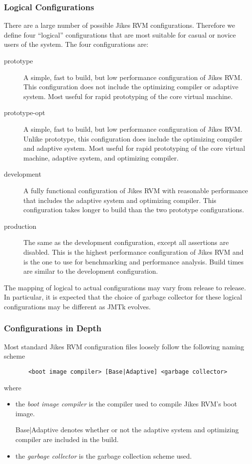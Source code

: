 \subsubsection{Logical Configurations}
There are a large number of possible Jikes RVM configurations.
Therefore we define four ``logical'' configurations that are most
suitable for casual or novice users of the system.  The four
configurations are: 
\begin{description}
\item [prototype] A simple, fast to build, but low performance
configuration of Jikes RVM.  This configuration does not include the
optimizing compiler or adaptive system.  Most useful for rapid
prototyping of the core virtual machine.
\item [prototype-opt] A simple, fast to build, but low performance
configuration of Jikes RVM.  Unlike prototype, this configuration does
include the optimizing compiler and adaptive system. Most useful for
rapid prototyping of the core virtual machine, adaptive system, and
optimizing compiler. 
\item [development] A fully functional configuration of
Jikes RVM with reasonable performance that includes the adaptive
system and optimizing compiler. This configuration takes longer to
build than the two prototype configurations.
\item [production] The same as the development configuration,
except all assertions are disabled.  This is the highest performance
configuration of Jikes RVM and is the one to use for benchmarking and
performance analysis. Build times are similar to the development
configuration. 
\end{description}
The mapping of logical to actual configurations may vary from release
to release.  In particular, it is expected that the choice of garbage
collector for these logical configurations may be different as JMTk
evolves. 

\subsubsection{Configurations in Depth}

Most standard Jikes RVM configuration files loosely follow the
following naming scheme 
\begin{verbatim}
       <boot image compiler> [Base|Adaptive] <garbage collector>
\end{verbatim}

where
\begin{itemize}
\item the {\em boot image compiler} is the compiler used to compile
Jikes RVM's boot image. 
\item [Base|Adaptive] denotes whether or not the adaptive system and
optimizing compiler are included in the build. 
\item the {\em garbage collector} is the garbage collection scheme used.
\end{itemize}

